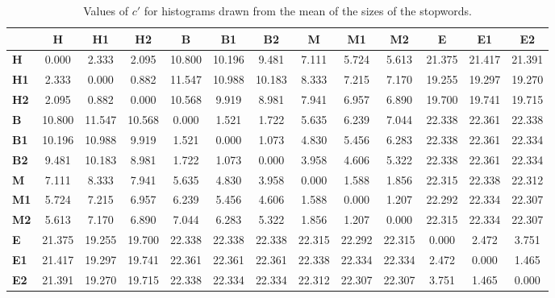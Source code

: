 \begin{table*}[h!]
\begin{center}
\begin{tabular}{| l || c | c | c || c | c | c || c | c | c || c | c | c |}\hline
 & {\bf H} & {\bf H1} & {\bf H2} & {\bf B} & {\bf B1} & {\bf B2} & {\bf M} & {\bf M1} & {\bf M2} & {\bf E} & {\bf E1} & {\bf E2} \\\hline\hline
{\bf H} & 0.000 & 2.333 & 2.095 & 10.800 & 10.196 & 9.481 & 7.111 & 5.724 & 5.613 & 21.375 & 21.417 & 21.391 \\\hline
{\bf H1} & 2.333 & 0.000 & 0.882 & 11.547 & 10.988 & 10.183 & 8.333 & 7.215 & 7.170 & 19.255 & 19.297 & 19.270 \\\hline
{\bf H2} & 2.095 & 0.882 & 0.000 & 10.568 & 9.919 & 8.981 & 7.941 & 6.957 & 6.890 & 19.700 & 19.741 & 19.715 \\\hline\hline
{\bf B} & 10.800 & 11.547 & 10.568 & 0.000 & 1.521 & 1.722 & 5.635 & 6.239 & 7.044 & 22.338 & 22.361 & 22.338 \\\hline
{\bf B1} & 10.196 & 10.988 & 9.919 & 1.521 & 0.000 & 1.073 & 4.830 & 5.456 & 6.283 & 22.338 & 22.361 & 22.334 \\\hline
{\bf B2} & 9.481 & 10.183 & 8.981 & 1.722 & 1.073 & 0.000 & 3.958 & 4.606 & 5.322 & 22.338 & 22.361 & 22.334 \\\hline\hline
{\bf M} & 7.111 & 8.333 & 7.941 & 5.635 & 4.830 & 3.958 & 0.000 & 1.588 & 1.856 & 22.315 & 22.338 & 22.312 \\\hline
{\bf M1} & 5.724 & 7.215 & 6.957 & 6.239 & 5.456 & 4.606 & 1.588 & 0.000 & 1.207 & 22.292 & 22.334 & 22.307 \\\hline
{\bf M2} & 5.613 & 7.170 & 6.890 & 7.044 & 6.283 & 5.322 & 1.856 & 1.207 & 0.000 & 22.315 & 22.334 & 22.307 \\\hline\hline
{\bf E} & 21.375 & 19.255 & 19.700 & 22.338 & 22.338 & 22.338 & 22.315 & 22.292 & 22.315 & 0.000 & 2.472 & 3.751 \\\hline
{\bf E1} & 21.417 & 19.297 & 19.741 & 22.361 & 22.361 & 22.361 & 22.338 & 22.334 & 22.334 & 2.472 & 0.000 & 1.465 \\\hline
{\bf E2} & 21.391 & 19.270 & 19.715 & 22.338 & 22.334 & 22.334 & 22.312 & 22.307 & 22.307 & 3.751 & 1.465 & 0.000 \\\hline
\end{tabular}
\caption{Values of $c'$ for histograms drawn from the mean of the sizes of the stopwords.}
\end{center}
\end{table*}